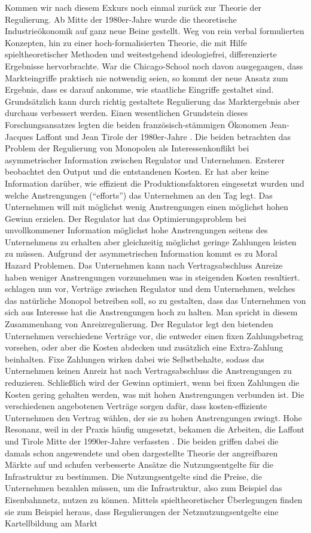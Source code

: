 Kommen wir nach diesem Exkurs noch einmal zurück zur Theorie der Regulierung. Ab Mitte der 1980er-Jahre wurde die theoretische Industrieökonomik auf ganz neue Beine gestellt. Weg von rein verbal formulierten Konzepten, hin zu einer hoch-formalisierten Theorie, die mit Hilfe spieltheoretischer Methoden und weitestgehend ideologiefrei, differenzierte Ergebnisse hervorbrachte. War die Chicago-School noch davon ausgegangen, dass Markteingriffe praktisch nie notwendig seien, so kommt der neue Ansatz zum Ergebnis, dass es darauf ankomme, wie staatliche Eingriffe gestaltet sind. Grundsätzlich kann durch richtig gestaltete Regulierung das Marktergebnis aber durchaus verbessert werden. Einen wesentlichen Grundstein dieses Forschungsansatzes legten die beiden französisch-stämmigen Ökonomen Jean-Jacques Laffont und Jean Tirole der 1980er-Jahre \parencite{Tirole1986}. Die beiden betrachten das Problem der Regulierung von Monopolen als Interessenkonflikt bei asymmetrischer Information zwischen Regulator und Unternehmen. Ersterer beobachtet den Output und die entstandenen Kosten. Er hat aber keine Information darüber, wie effizient die Produktionsfaktoren eingesetzt wurden und welche Anstrengungen ("`efforts"') das Unternehmen an den Tag legt. Das Unternehmen will mit möglichst wenig Anstrengungen einen möglichst hohen Gewinn erzielen. Der Regulator hat das Optimierungsproblem bei unvollkommener Information möglichst hohe Anstrengungen seitens des Unternehmens zu erhalten aber gleichzeitig möglichst geringe Zahlungen leisten zu müssen. Aufgrund der asymmetrischen Information kommt es zu Moral Hazard Problemen. Das Unternehmen kann nach Vertragsabschluss Anreize haben weniger Anstrengungen vorzunehmen was in steigenden Kosten resultiert. \textcite{Tirole1986} schlagen nun vor, Verträge zwischen Regulator und dem Unternehmen, welches das natürliche Monopol betreiben soll, so zu gestalten, dass das Unternehmen von sich aus Interesse hat die Anstrengungen hoch zu halten. Man spricht in diesem Zusammenhang von Anreizregulierung. Der Regulator legt den bietenden Unternehmen verschiedene Verträge vor, die entweder einen fixen Zahlungsbetrag vorsehen, oder aber die Kosten abdecken und zusätzlich eine Extra-Zahlung beinhalten. Fixe Zahlungen wirken dabei wie Selbstbehalte, sodass das Unternehmen keinen Anreiz hat nach Vertragsabschluss die Anstrengungen zu reduzieren. Schließlich wird der Gewinn optimiert, wenn bei fixen Zahlungen die Kosten gering gehalten werden, was mit hohen Anstrengungen verbunden ist. Die verschiedenen angebotenen Verträge sorgen dafür, dass kosten-effiziente Unternehmen den Vertrag wählen, der sie zu hohen Anstrengungen zwingt. Hohe Resonanz, weil in der Praxis häufig umgesetzt, bekamen die Arbeiten, die Laffont und Tirole Mitte der 1990er-Jahre verfassten \parencite{Tirole1996}. Die beiden griffen dabei die damals schon angewendete und oben dargestellte Theorie der angreifbaren Märkte auf und schufen verbesserte Ansätze die Nutzungsentgelte für die Infrastruktur zu bestimmen. Die Nutzungsentgelte sind die Preise, die  Unternehmen bezahlen müssen, um die Infrastruktur, also zum Beispiel das Eisenbahnnetz, nutzen zu können. Mittels spieltheoretischer Überlegungen finden sie zum Beispiel heraus, dass Regulierungen der Netznutzungsentgelte eine Kartellbildung am Markt 